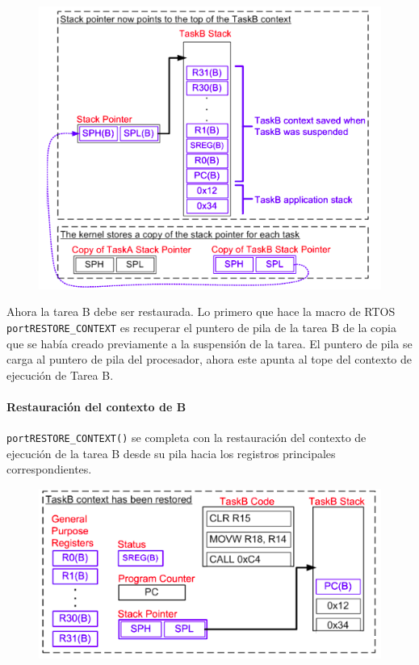 \begin{figure}[H]
    \centering
    \includegraphics[scale=0.7]{RTOS/f8.PNG}
\end{figure}

Ahora la tarea B debe ser restaurada. Lo primero que hace la macro de RTOS \texttt{portRESTORE\_CONTEXT} es recuperar el puntero de pila de la tarea B de la copia que se había creado previamente a la suspensión de la tarea. El puntero de pila se carga al puntero de pila del procesador, ahora este apunta al tope del contexto de ejecución de Tarea B.

\paragraph{Restauración del contexto de B}

\texttt{portRESTORE\_CONTEXT()} se completa con la restauración del contexto de ejecución de la tarea B desde su pila hacia los registros principales correspondientes.

\begin{figure}[H]
    \centering
    \includegraphics[scale=0.7]{RTOS/f9.PNG}
\end{figure}

